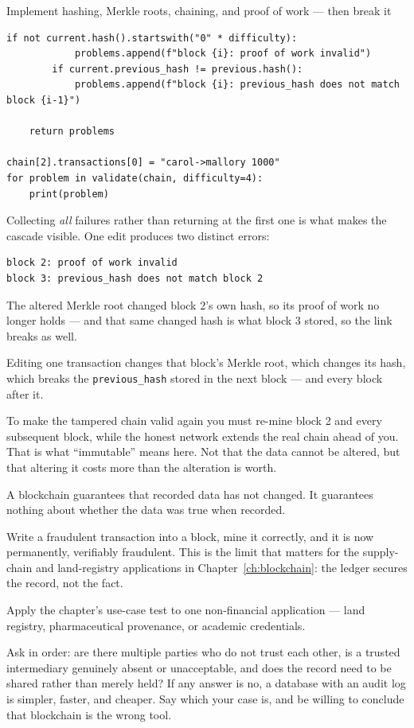 \begin{labproject}{Implement hashing, Merkle roots, chaining, and proof of work --- then break it}
\begin{lstlisting}[style=mlpython]
        if not current.hash().startswith("0" * difficulty):
            problems.append(f"block {i}: proof of work invalid")
        if current.previous_hash != previous.hash():
            problems.append(f"block {i}: previous_hash does not match block {i-1}")

    return problems

chain[2].transactions[0] = "carol->mallory 1000"
for problem in validate(chain, difficulty=4):
    print(problem)
\end{lstlisting}

Collecting \emph{all} failures rather than returning at the first one is what makes the cascade visible. One edit produces two distinct errors:

\begin{lstlisting}[style=mlterminal]
block 2: proof of work invalid
block 3: previous_hash does not match block 2
\end{lstlisting}

The altered Merkle root changed block 2's own hash, so its proof of work no longer holds --- and that same changed hash is what block 3 stored, so the link breaks as well.

\begin{keyidea}
Editing one transaction changes that block's Merkle root, which changes its hash, which breaks the \texttt{previous\_hash} stored in the next block --- and every block after it.

To make the tampered chain valid again you must re-mine block 2 and every subsequent block, while the honest network extends the real chain ahead of you. That is what ``immutable'' means here. Not that the data cannot be altered, but that altering it costs more than the alteration is worth.
\end{keyidea}

\begin{pitfall}
A blockchain guarantees that recorded data has not changed. It guarantees nothing about whether the data was true when recorded.

Write a fraudulent transaction into a block, mine it correctly, and it is now permanently, verifiably fraudulent. This is the limit that matters for the supply-chain and land-registry applications in Chapter~\ref{ch:blockchain}: the ledger secures the record, not the fact.
\end{pitfall}

\begin{tryit}
Apply the chapter's use-case test to one non-financial application --- land registry, pharmaceutical provenance, or academic credentials.

Ask in order: are there multiple parties who do not trust each other, is a trusted intermediary genuinely absent or unacceptable, and does the record need to be shared rather than merely held? If any answer is no, a database with an audit log is simpler, faster, and cheaper. Say which your case is, and be willing to conclude that blockchain is the wrong tool.
\end{tryit}
\end{labproject}


